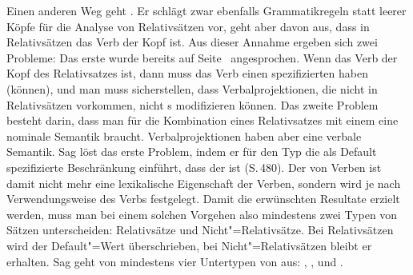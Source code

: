 Einen anderen Weg geht \citet{Sag97a}. Er schlägt zwar ebenfalls Grammatikregeln statt leerer Köpfe
für die Analyse von Relativsätzen vor, geht aber davon aus, dass in Relativsätzen das Verb der Kopf
ist. Aus dieser Annahme ergeben sich zwei Probleme: Das erste wurde bereits auf
Seite~\pageref{Erklaerung-relativizer} angesprochen. Wenn das Verb der Kopf des Relativsatzes ist,
dann muss das Verb einen spezifizierten \modw haben (können), und man muss sicherstellen, dass
Verbalprojektionen, die nicht in Relativsätzen vorkommen, nicht \nbar{}s modifizieren können. Das
zweite Problem besteht darin, dass man für die Kombination eines Relativsatzes mit einem \nbar eine
nominale Semantik braucht. Verbalprojektionen haben aber eine verbale Semantik. Sag löst das erste
Problem, indem er für den Typ  die als Default spezifizierte Beschränkung
einführt, dass der \modw {} ist (S.\,480). Der \modw von Verben ist damit nicht mehr eine
lexikalische Eigenschaft der Verben, sondern wird je nach Verwendungsweise des Verbs
festgelegt. Damit die erwünschten Resultate erzielt werden, muss man bei einem solchen Vorgehen also
mindestens zwei Typen von Sätzen unterscheiden: Relativsätze und Nicht"=Relativsätze. Bei
Relativsätzen wird der Default"=Wert überschrieben, bei Nicht"=Relativsätzen bleibt er erhalten. Sag geht von
mindestens vier Untertypen von  aus: , ,  und
. 
